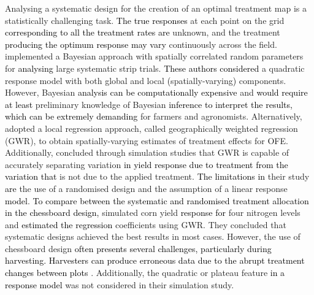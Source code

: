 \documentclass[a4paper]{article} 	%
\newcommand{\revision}[1]{\textcolor{black}{#1}}
\newcommand{\zc}[1]{\textcolor{black}{#1}}
\begin{document}
Analysing a systematic design for the creation of an optimal treatment map is a statistically challenging task. \revision{The true responses} at each point on the grid \revision{corresponding to all the treatment rates are} unknown, and the treatment \revision{producing the optimum response may vary} continuously across the field. \textcite{Cao2022Bayesian} implemented a Bayesian approach with spatially correlated random parameters for \revision{analysing} large systematic strip trials.
\revision{These authors considered} a quadratic response model with both global and local \revision{(}spatially-varying\revision{)} components. However, Bayesian \revision{analysis can be computationally expensive} and \revision{would require at least} preliminary knowledge of Bayesian \revision{inference to interpret the results, which can be extremely demanding} for farmers and agronomists. Alternatively, \textcite{Rakshit2020Novel} adopted a local regression approach, called geographically weighted regression (GWR), to obtain spatially-varying estimates of treatment effects for OFE. Additionally, \textcite{Evans2020Assessment} concluded through simulation studies that GWR is capable of accurately separating variation \revision{in yield response due to treatment from} \revision{the variation that} is not due to the applied treatment. \zc{The limitations in} their study \zc{are} the use of a randomised design and the assumption of a linear response \revision{model}. \revision{To compare between the systematic and randomised treatment allocation in the chessboard design,} \textcite{Alesso2021Design} simulated corn yield \revision{response} \revision{for} four nitrogen levels and \revision{estimated the regression} coefficients using GWR. They concluded that systematic designs achieved the best results in most cases. However, the use of chessboard design \revision{often presents several challenges, particularly during harvesting. Harvesters can produce erroneous data due to the abrupt treatment changes between plots} \parencite{Pringle2004FieldScale}. Additionally, the quadratic or plateau feature \revision{in a response model} was not considered in their simulation study.

\end{document}
